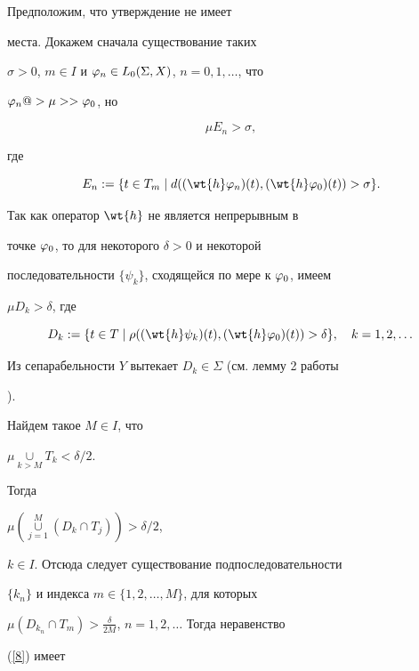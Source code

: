 \begin{pf} Предположим, что утверждение не имеет


места. Докажем сначала существование таких


$\sigma >0$, $m\in I$ и $\varphi_n\in L_0(\Sigma,X)$, $n=0,1,\dotsc$, что


$\varphi_n@>{\mu}>>\varphi_0$, но


\begin{equation}


\label{8}


\mu E_n >\sigma,


\end{equation}


где


$$


E_n:=\{t\in T_m\mid d((\wt{h}\f_n)(t),(\wt{h}\f_0)(t))>\sigma\}.


$$





Так как оператор $\wt{h}$ не является непрерывным в


точке $\varphi_0$, то для некоторого $\delta >0$ и некоторой


последовательности $\{\psi_k\}$, сходящейся по мере к $\varphi_0$, имеем


$\mu D_k>\delta$, где


$$


D_k:=\{t\in


T\mid \rho((\wt{h}\psi_k)(t),(\wt{h}\f_0)(t))>\delta


\}, \quad k=1,2,\dotsc


$$


Из сепарабельности $Y$ вытекает $D_k\in\Sigma$ (см. лемму 2 работы


\cite{78}).


Найдем такое $M\in I$, что


$\mu\mathop{\mathop{\cup}\limits}\limits_{k>M}


T_k<\delta /2$.


Тогда


$\mu\left(\mathop{\cup}\limits_{j=1}^M(D_k\cap T_j)\right)>\delta /2$,


$k\in I$. Отсюда следует существование подпоследовательности


$\{k_n\}$ и индекса $m\in\{1,2,\dotsc,M\}$, для которых


$\mu(D_{k_n}\cap


T_m)>\frac{\delta}{2M}$, $n=1,2,\dotsc$ Тогда неравенство


(\ref{8}) имеет



\end{pf}
